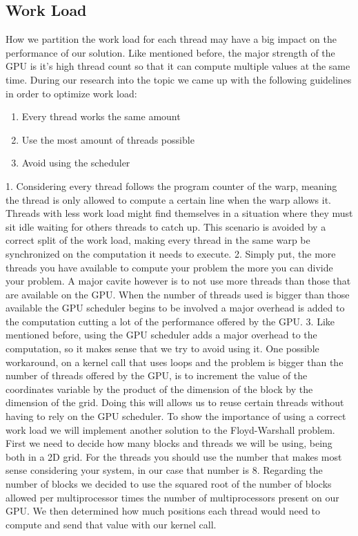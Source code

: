 \documentclass[runningheads]{llncs}
\begin{document}
\subsection{Work Load}

How we partition the work load for each thread may have a big impact on the performance of our solution. Like mentioned before, the major strength of the GPU is it's high thread count so that it can compute multiple values at the same time.
During our research into the topic we came up with the following guidelines in order to optimize work load: %
\begin{enumerate}
	\item Every thread works the same amount
	\item Use the most amount of threads possible
	\item Avoid using the scheduler
	\newline
\end{enumerate}
1. Considering every thread follows the program counter of the warp, meaning the thread is only allowed to compute a certain line when the warp allows it.
Threads with less work load might find themselves in a situation where they must sit idle waiting for others threads to catch up.
This scenario is avoided by a correct split of the work load, making every thread in the same warp be synchronized on the computation it needs to execute.
\newline
\newline
2. Simply put, the more threads you have available to compute your problem the more you can divide your problem. A major cavite however is to not use more threads than those that are available on the GPU. When the number of threads used is bigger than those available the GPU scheduler begins to be involved a major overhead is added to the computation cutting a lot of the performance offered by the GPU.
\newline
\newline
3. Like mentioned before, using the GPU scheduler adds a major overhead to the computation, so it makes sense that we try to avoid using it.
One possible workaround, on a kernel call that uses loops and the problem is bigger than the number of threads offered by the GPU, is to increment the value of the coordinates variable by the product of the dimension of the block by the dimension of the grid. Doing this will allows us to reuse certain threads without having to rely on the GPU scheduler.
\newline
\newline
To show the importance of using a correct work load we will implement another solution to the Floyd-Warshall problem. First we need to decide how many blocks and threads we will be using, being both in a 2D grid. For the threads you should use the number that makes most sense considering your system, in our case that number is 8. Regarding the number of blocks we decided to use the squared root of the number of blocks allowed per multiprocessor times the number of multiprocessors present on our GPU. We then determined how much positions each thread would need to compute and send that value with our kernel call.
\end{document}
